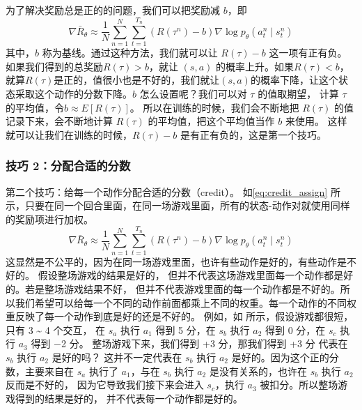 为了解决奖励总是正的的问题，我们可以把奖励减 $b$，即
\begin{equation}
    \label{eq:}
    \nabla \bar{R}_{\theta} \approx \frac{1}{N} \sum_{n=1}^{N} \sum_{t=1}^{T_{n}}\left(R\left(\tau^{n}\right)-b\right) \nabla \log p_{\theta}\left(a_{t}^{n} \mid s_{t}^{n}\right)
\end{equation}
其中，$b$ 称为基线。通过这种方法，我们就可以让 $R(\tau)-b$ 这一项有正有负。如果我们得到的总奖励$R(\tau)>b$，就让 $(s,a)$ 的概率上升。如果$R(\tau)<b$，就算$R(\tau)$是正的，值很小也是不好的，我们就让$(s,a)$的概率下降，让这个状态采取这个动作的分数下降。$b$ 怎么设置呢？我们可以对 $\tau$ 的值取期望， 计算 $\tau$ 的平均值，令$b \approx E[R(\tau)]$。
所以在训练的时候，我们会不断地把 $R(\tau)$ 的值记录下来，会不断地计算 $R(\tau)$ 的平均值，把这个平均值当作 $b$ 来使用。 这样就可以让我们在训练的时候，$R(\tau)-b$ 是有正有负的，这是第一个技巧。

\subsubsection{技巧 2：分配合适的分数}

第二个技巧：给每一个动作分配合适的分数（credit）。
如\eqref{eq:credit_assign} 所示，只要在同一个回合里面，在同一场游戏里面，所有的状态-动作对就使用同样的奖励项进行加权。
\begin{equation}
    \label{eq:credit_assign}
    \nabla \bar{R}_{\theta} \approx \frac{1}{N} \sum_{n=1}^{N} \sum_{t=1}^{T_{n}}\left(R\left(\tau^{n}\right)-b\right) \nabla \log p_{\theta}\left(a_{t}^{n} \mid s_{t}^{n}\right)
\end{equation}
这显然是不公平的，因为在同一场游戏里面，也许有些动作是好的，有些动作是不好的。 假设整场游戏的结果是好的， 但并不代表这场游戏里面每一个动作都是好的。若是整场游戏结果不好， 但并不代表游戏里面的每一个动作都是不好的。所以我们希望可以给每一个不同的动作前面都乘上不同的权重。每一个动作的不同权重反映了每一个动作到底是好的还是不好的。 
例如，如 所示，假设游戏都很短，只有 3 \~{} 4 个交互， 在 $s_a$ 执行 $a_1$ 得到 5 分，在 $s_b$ 执行 $a_2$ 得到 0 分，在 $s_c$ 执行 $a_3$ 得到 $-$2 分。 整场游戏下来，我们得到 +3 分，那我们得到 +3 分 代表在 $s_b$ 执行 $a_2$ 是好的吗？
这并不一定代表在 $s_b$ 执行 $a_2$ 是好的。因为这个正的分数，主要来自在 $s_a$ 执行了 $a_1$，与在 $s_b$ 执行 $a_2$ 是没有关系的，也许在 $s_b$ 执行 $a_2$ 反而是不好的， 因为它导致我们接下来会进入 $s_c$，执行 $a_3$ 被扣分。所以整场游戏得到的结果是好的， 并不代表每一个动作都是好的。

